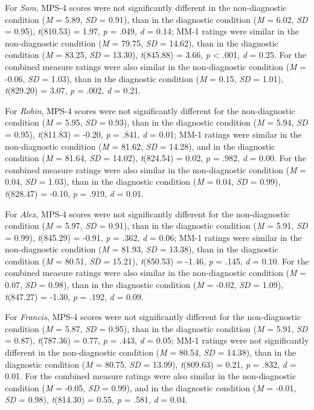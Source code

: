 \documentclass[
  man,floatsintext]{apa6}
\begin{document}
For \emph{Sam}, MPS-4 scores were not significantly different in the non-diagnostic condition (\emph{M} = 5.89, \emph{SD} = 0.91), than in the diagnostic condition (\emph{M} = 6.02, \emph{SD} = 0.95), \emph{t}(810.53) = 1.97, \emph{p} = .049, \emph{d} = 0.14; MM-1 ratings were similar in the non-diagnostic condition (\emph{M} = 79.75, \emph{SD} = 14.62), than in the diagnostic condition (\emph{M} = 83.25, \emph{SD} = 13.30), \emph{t}(845.88) = 3.66, \emph{p} \textless{} .001, \emph{d} = 0.25. For the combined measure ratings were also similar in the non-diagnostic condition (\emph{M} = -0.06, \emph{SD} = 1.03), than in the diagnostic condition (\emph{M} = 0.15, \emph{SD} = 1.01), \emph{t}(829.20) = 3.07, \emph{p} = .002, \emph{d} = 0.21.

For \emph{Robin}, MPS-4 scores were not significantly different for the non-diagnostic condition (\emph{M} = 5.95, \emph{SD} = 0.93), than in the diagnostic condition (\emph{M} = 5.94, \emph{SD} = 0.95), \emph{t}(811.83) = -0.20, \emph{p} = .841, \emph{d} = 0.01; MM-1 ratings were similar in the non-diagnostic condition (\emph{M} = 81.62, \emph{SD} = 14.28), and in the diagnostic condition (\emph{M} = 81.64, \emph{SD} = 14.02), \emph{t}(824.54) = 0.02, \emph{p} = .982, \emph{d} = 0.00. For the combined measure ratings were also similar in the non-diagnostic condition (\emph{M} = 0.04, \emph{SD} = 1.03), than in the diagnostic condition (\emph{M} = 0.04, \emph{SD} = 0.99), \emph{t}(828.47) = -0.10, \emph{p} = .919, \emph{d} = 0.01.

For \emph{Alex}, MPS-4 scores were not significantly different for the non-diagnostic condition (\emph{M} = 5.97, \emph{SD} = 0.91), than in the diagnostic condition (\emph{M} = 5.91, \emph{SD} = 0.99), \emph{t}(845.29) = -0.91, \emph{p} = .362, \emph{d} = 0.06; MM-1 ratings were similar in the non-diagnostic condition (\emph{M} = 81.93, \emph{SD} = 13.38), than in the diagnostic condition (\emph{M} = 80.51, \emph{SD} = 15.21), \emph{t}(850.53) = -1.46, \emph{p} = .145, \emph{d} = 0.10. For the combined measure ratings were also similar in the non-diagnostic condition (\emph{M} = 0.07, \emph{SD} = 0.98), than in the diagnostic condition (\emph{M} = -0.02, \emph{SD} = 1.09), \emph{t}(847.27) = -1.30, \emph{p} = .192, \emph{d} = 0.09.

For \emph{Francis}, MPS-4 scores were not significantly different for the non-diagnostic condition (\emph{M} = 5.87, \emph{SD} = 0.95), than in the diagnostic condition (\emph{M} = 5.91, \emph{SD} = 0.87), \emph{t}(787.36) = 0.77, \emph{p} = .443, \emph{d} = 0.05; MM-1 ratings were not significantly different in the non-diagnostic condition (\emph{M} = 80.54, \emph{SD} = 14.38), than in the diagnostic condition (\emph{M} = 80.75, \emph{SD} = 13.99), \emph{t}(809.63) = 0.21, \emph{p} = .832, \emph{d} = 0.01. For the combined measure ratings were also similar in the non-diagnostic condition (\emph{M} = -0.05, \emph{SD} = 0.99), and in the diagnostic condition (\emph{M} = -0.01, \emph{SD} = 0.98), \emph{t}(814.30) = 0.55, \emph{p} = .581, \emph{d} = 0.04.
\end{document}
